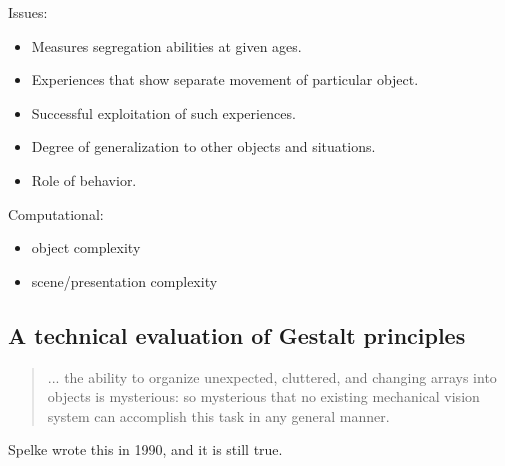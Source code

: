 Issues:

\begin{itemize}

\item Measures segregation abilities at given ages.

\item Experiences that show separate movement of particular object.

\item Successful exploitation of such experiences.

\item Degree of generalization to other objects and situations.

\item Role of behavior.

\end{itemize}

Computational:

\begin{itemize}

\item object complexity

\item scene/presentation complexity

\end{itemize}


\subsection{A technical evaluation of Gestalt principles}

\begin{quote}

... the ability to organize unexpected, cluttered, and
changing arrays into objects is mysterious: so mysterious
that no existing mechanical vision system can accomplish this task
in any general manner.

\end{quote}

Spelke wrote this in 1990, and it is still true.


